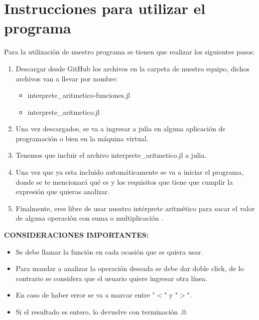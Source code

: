 \documentclass{article}
\begin{document}
\section{Instrucciones para utilizar el programa}
\normalsize Para la utilización de nuestro programa se tienen que realizar los siguientes pasos:
\begin{enumerate}
    \item Descargar desde GitHub los archivos en la carpeta de nuestro equipo, dichos archivos van a llevar por nombre:
    \begin{itemize}
        \item interprete\_aritmetico-funciones.jl
        \item interprete\_aritmetico.jl
    \end{itemize}
    \item Una vez descargados, se va a ingresar a julia en alguna aplicación de programación o bien en la máquina virtual.
    \item Tenemos que incluir el archivo interprete\_aritmetico.jl a julia.
    \item Una vez que ya esta incluido automáticamente se va a iniciar el programa, donde se te mencionará qué es y los requisitos que tiene que cumplir la expresión que quieras analizar.
    \item Finalmente, eres libre de usar nuestro intérprete aritmético para sacar el valor de alguna operación con suma o multiplicación .
\end{enumerate}
\large \textbf{CONSIDERACIONES IMPORTANTES:}
\normalsize
\begin{itemize}
    \item Se debe llamar la función en cada ocasión que se quiera usar.
    \item Para mandar a analizar la operación deseada se debe dar doble click, de lo contrario se considera que el usuario quiere ingresar otra línea.
    \item En caso de haber error se va a marcar entre "$<$" y "$>$".
    \item Si el resultado es entero, lo devuelve con terminación .0.
\end{itemize}
\end{document}

